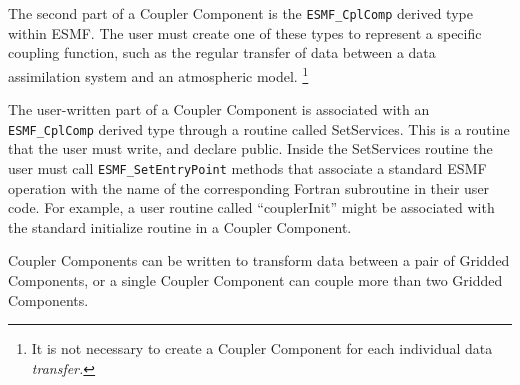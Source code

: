 The second part of a Coupler Component is the {\tt ESMF\_CplComp}
derived type within ESMF.  The user must create one of these types
to represent a specific coupling function, such as the regular
transfer of data between a data assimilation system and an 
atmospheric model.  \footnote{It is not necessary to create 
a Coupler Component for each individual data {\it transfer.}}

The user-written part of a Coupler Component is associated with an
{\tt ESMF\_CplComp} derived type through a routine called SetServices.
This is a routine that the user must write, and declare public.
Inside the SetServices routine the user must call 
{\tt ESMF\_SetEntryPoint} methods that associate a standard ESMF 
operation with the name of the corresponding Fortran subroutine in 
their user code.  For example, a user routine called ``couplerInit''
might be associated with the standard initialize routine in a 
Coupler Component.

Coupler Components can be written to transform data between a 
pair of Gridded Components, or a single Coupler Component can couple 
more than two Gridded Components.

